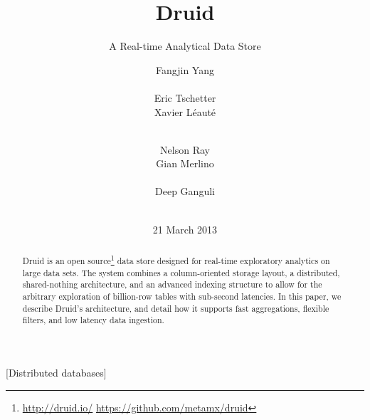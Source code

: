 \documentclass{sig-alternate-2013}
\begin{document}

\title{Druid}
\subtitle{A Real-time Analytical Data Store}


\author{
\alignauthor Fangjin Yang\\
  \\
\alignauthor Eric Tschetter\\
\alignauthor Xavier Léauté\\
  \\
\and
\alignauthor Nelson Ray\\
\alignauthor Gian Merlino\\
  \\
\alignauthor Deep Ganguli\\
  \\
}
\date{21 March 2013}


\maketitle

\begin{abstract} 
Druid is an open
source\footnote{\href{http://druid.io/}{http://druid.io/} \href{https://github.com/metamx/druid}{https://github.com/metamx/druid}}
data store designed for real-time exploratory analytics on large data sets.
The system combines a column-oriented storage layout, a distributed,
shared-nothing architecture, and an advanced indexing structure to allow for
the arbitrary exploration of billion-row tables with sub-second latencies. In
this paper, we describe Druid's architecture, and detail how it supports fast
aggregations, flexible filters, and low latency data ingestion.  
\end{abstract}

[Distributed databases]
\end{document}

